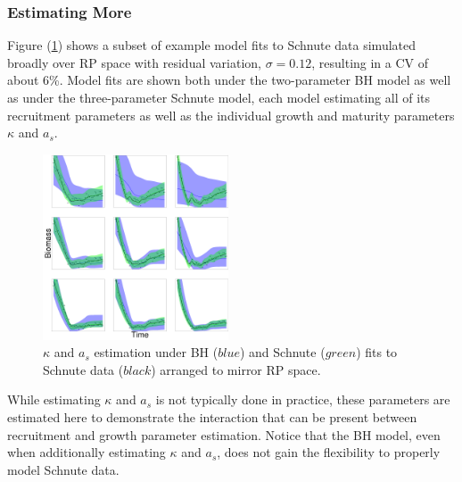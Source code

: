 %
\subsubsection{Estimating More\label{estMore}}

%
Figure (\ref{estAK}) shows a subset of example model fits to Schnute data 
simulated broadly over RP space with residual variation, $\sigma=0.12$, 
resulting in a CV of about 6\%.
Model fits are shown both under the two-parameter BH model as well as under the
three-parameter Schnute model, each model estimating all of its recruitment parameters  
as well as the individual growth and maturity parameters $\kappa$ and $a_s$.
\begin{figure}
\includegraphics[width=0.49\textwidth]{../ddBias/indexGridKAExpT45N300A0-1AS10K0.1.png}
\caption{
$\kappa$ and $a_s$ estimation under BH ($blue$) and Schnute ($green$) fits to
Schnute data ($black$) arranged to mirror RP space. %
}\label{estAK}
\end{figure}
While estimating $\kappa$ and $a_s$ is not typically done in practice, these 
parameters are estimated here to demonstrate the interaction that can be present 
between recruitment and growth parameter estimation. Notice that the BH model, even 
when additionally estimating $\kappa$ and $a_s$, does not gain the flexibility 
to properly model Schnute data.

